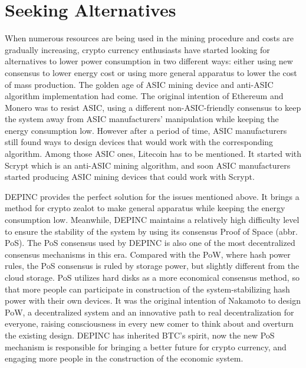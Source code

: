 \section{Seeking Alternatives}
\begin{flushleft}
    When numerous resources are being used in the mining procedure and costs are gradually increasing, crypto currency enthusiasts have started looking for alternatives to lower power consumption in two different ways: either using new consensus to lower energy cost or using more general apparatus to lower the cost of mass production. The golden age of ASIC mining device and anti-ASIC algorithm implementation had come. The original intention of Ethereum and Monero was to resist ASIC, using a different non-ASIC-friendly consensus to keep the system away from ASIC manufacturers’ manipulation while keeping the energy consumption low. However after a period of time, ASIC manufacturers still found ways to design devices that would work with the corresponding algorithm. Among those ASIC ones, Litecoin has to be mentioned. It started with Scrypt which is an anti-ASIC mining algorithm, and soon ASIC manufacturers started producing ASIC mining devices that could work with Scrypt.
\end{flushleft}
\begin{flushleft}
    DEPINC provides the perfect solution for the issues mentioned above. It brings a method for crypto zealot to make general apparatus while keeping the energy consumption low. Meanwhile, DEPINC maintains a relatively high difficulty level to ensure the stability of the system by using its consensus Proof of Space (abbr. PoS). The PoS consensus used by DEPINC is also one of the most decentralized consensus mechanisms in this era. Compared with the PoW, where hash power rules, the PoS consensus is ruled by storage power, but slightly different from the cloud storage. PoS utilizes hard disks as a more economical consensus method, so that more people can participate in construction of the system-stabilizing hash power with their own devices. It was the original intention of Nakamoto to design PoW, a decentralized system and an innovative path to real decentralization for everyone, raising consciousness in every new comer to think about and overturn the existing design. DEPINC has inherited BTC’s spirit, now the new PoS mechanism is responsible for bringing a better future for crypto currency, and engaging more people in the construction of the economic system.
\end{flushleft}

